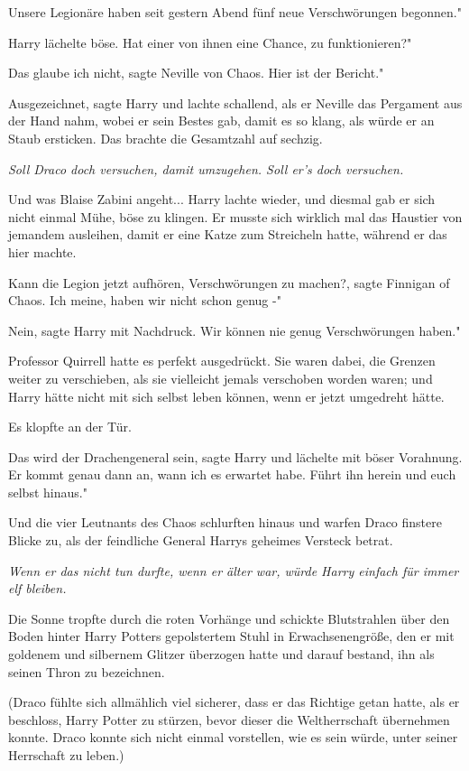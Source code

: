 \glqq Unsere Legionäre haben seit gestern Abend fünf neue Verschwörungen
begonnen."

Harry lächelte böse. \glqq Hat einer von ihnen eine Chance, zu funktionieren?"

\glqq Das glaube ich nicht\grqq{}, sagte Neville von Chaos. \glqq Hier ist der
Bericht."

\glqq Ausgezeichnet\grqq{}, sagte Harry und lachte schallend, als er Neville das
Pergament aus der Hand nahm, wobei er sein Bestes gab, damit es so klang, als
würde er an Staub ersticken. Das brachte die Gesamtzahl auf sechzig.

\emph{Soll Draco doch versuchen, damit umzugehen. Soll er's doch versuchen.}

Und was Blaise Zabini angeht... Harry lachte wieder, und diesmal gab er sich
nicht einmal Mühe, böse zu klingen. Er musste sich wirklich mal das Haustier von
jemandem ausleihen, damit er eine Katze zum Streicheln hatte, während er das
hier machte.

\glqq Kann die Legion jetzt aufhören, Verschwörungen zu machen?\grqq{}, sagte
Finnigan of Chaos. \glqq Ich meine, haben wir nicht schon genug -"

\glqq Nein\grqq{}, sagte Harry mit Nachdruck. \glqq Wir können nie genug
Verschwörungen haben."

Professor Quirrell hatte es perfekt ausgedrückt. Sie waren dabei, die Grenzen
weiter zu verschieben, als sie vielleicht jemals verschoben worden waren; und
Harry hätte nicht mit sich selbst leben können, wenn er jetzt umgedreht hätte.

Es klopfte an der Tür.

\glqq Das wird der Drachengeneral sein\grqq{}, sagte Harry und lächelte mit
böser Vorahnung. \glqq Er kommt genau dann an, wann ich es erwartet habe. Führt
ihn herein und euch selbst hinaus."

Und die vier Leutnants des Chaos schlurften hinaus und warfen Draco finstere
Blicke zu, als der feindliche General Harrys geheimes Versteck betrat.

\emph{ Wenn er das nicht tun durfte, wenn er älter war, würde Harry einfach für immer elf bleiben. }

Die Sonne tropfte durch die roten Vorhänge und schickte Blutstrahlen über den
Boden hinter Harry Potters gepolstertem Stuhl in Erwachsenengröße, den er mit
goldenem und silbernem Glitzer überzogen hatte und darauf bestand, ihn als
seinen Thron zu bezeichnen.

(Draco fühlte sich allmählich viel sicherer, dass er das Richtige getan hatte,
als er beschloss, Harry Potter zu stürzen, bevor dieser die Weltherrschaft
übernehmen konnte. Draco konnte sich nicht einmal vorstellen, wie es sein würde,
unter seiner Herrschaft zu leben.)

